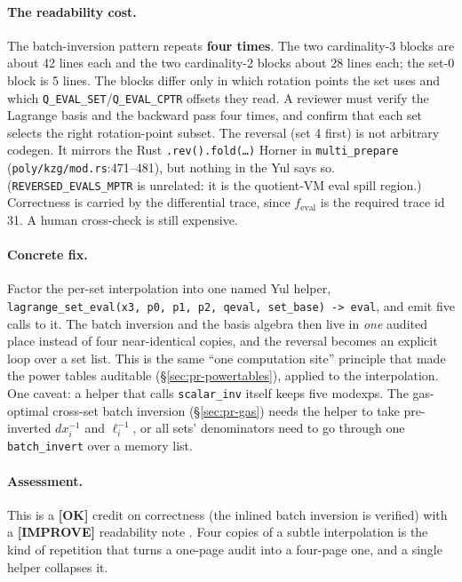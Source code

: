 \paragraph{The readability cost.}
The batch-inversion pattern repeats \textbf{four times}. The two
cardinality-3 blocks are about 42 lines each and the two
cardinality-2 blocks about 28 lines each; the set-0 block is 5
lines. The blocks differ only in which rotation points the set
uses and which \texttt{Q\_EVAL\_SET}/\texttt{Q\_EVAL\_CPTR} offsets
they read. A reviewer must verify the Lagrange basis and the
backward pass four times, and confirm that each set selects the
right rotation-point subset. The reversal (set 4 first) is not
arbitrary codegen. It mirrors the Rust
\texttt{.rev().fold(\ldots)} Horner in \texttt{multi\_prepare}
(\texttt{poly/kzg/mod.rs}:471--481), but nothing in the Yul says
so. (\texttt{REVERSED\_\allowbreak{}EVALS\_\allowbreak{}MPTR} is unrelated: it is the
quotient-VM eval spill region.) Correctness is carried by the
differential trace, since $f_\text{eval}$ is the required trace
id 31. A human cross-check is still expensive.

\paragraph{Concrete fix.}
Factor the per-set interpolation into one named Yul helper,
\texttt{lagrange\_\allowbreak{}set\_\allowbreak{}eval(x3, p0, p1, p2, qeval, set\_\allowbreak{}base) ->
eval}, and emit five calls to it. The batch inversion and the
basis algebra then live in \emph{one} audited place instead of
four near-identical copies, and the reversal becomes an explicit
loop over a set list. This is the same ``one computation site''
principle that made the power tables auditable
(\S\ref{sec:pr-powertables}), applied to the interpolation. One
caveat: a helper that calls \texttt{scalar\_inv} itself keeps five
modexps. The gas-optimal cross-set batch inversion
(\S\ref{sec:pr-gas}) needs the helper to take pre-inverted
$dx_i^{-1}$ and $\ell_i^{-1}$, or all sets' denominators need to go
through one \texttt{batch\_invert} over a memory list.

\paragraph{Assessment.} This is a
\textcolor{tracegreen}{\textbf{[OK]}} credit on correctness
(the inlined batch inversion is verified) with a
\textcolor{codegenblue}{\textbf{[IMPROVE]}} readability note
. Four copies of a subtle interpolation is the kind of
repetition that turns a one-page audit into a four-page one, and a
single helper collapses it.

